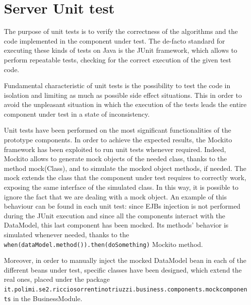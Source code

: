 \documentclass[a4paper,oneside,11pt]{book}
\begin{document}
    \section{Server Unit test}
    The purpose of unit tests is to verify the correctness of the algorithms and the code implemented in the component under test. The de-facto standard for executing these kinds of tests on Java is the JUnit framework, which allows to perform repeatable tests, checking for the correct execution of the given test code. \par
    Fundamental characteristic of unit tests is the possibility to test the code in isolation and limiting as much as possible side effect situations. This in order to avoid the unpleasant situation in which the execution of the tests leads the entire component under test in a state of inconsistency. \par
    Unit tests have been performed on the most significant functionalities of the prototype components. In order to achieve the expected results, the Mockito framework has been exploited to run unit tests whenever required. Indeed, Mockito allows to generate mock objects of the needed class, thanks to the method mock(Class), and to simulate the mocked object methods, if needed. The mock extends the class that the component under test requires to correctly work, exposing the same interface of the simulated class. In this way, it is possible to ignore the fact that we are dealing with a mock object. An example of this behaviour can be found in each unit test: since EJBs injection is not performed during the JUnit execution and since all the components interact with the DataModel, this last component has been mocked. Its methods’ behavior is simulated whenever needed, thanks to the \texttt{when(dataModel.method()).then(doSomething)} Mockito method. \par
    Moreover, in order to manually inject the mocked DataModel bean in each of the different beans under test, specific classes have been designed, which extend the real ones, placed under the package \texttt{it.polimi.se2.ricciosorrentinotriuzzi.business.components.mockcomponents} in the BusinessModule. 
    
\end{document}
